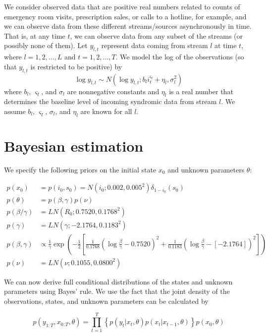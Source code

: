 \documentclass{article}
\begin{document}
We consider observed data that are positive real numbers related to counts of emergency room visits, prescription sales, or calls to a hotline, for example, and we can observe data from these different streams/sources asynchronously in time. That is, at any time $t$, we can observe data from any subset of the streams (or possibly none of them). Let $y_{l,t}$ represent data coming from stream $l$ at time $t$, where $l = 1,2,\ldots,L$ and $t = 1,2,\ldots,T$. We model the log of the observations (so that $y_{l,t}$ is restricted to be positive) by
\begin{equation}
\log y_{l,t} \sim N\left(\log y_{l,t};b_li_t^{\varsigma_l} + \eta_l,\sigma_l^2\right) \label{eqn:obs}
\end{equation}
where $b_l$, $\varsigma_l$, and $\sigma_l$ are nonnegative constants and $\eta_l$ is a real number that determines the baseline level of incoming syndromic data from stream $l$. We assume $b_l$, $\varsigma_l$, $\sigma_l$, and $\eta_l$ are known for all $l$.

\section{Bayesian estimation}

We specify the following priors on the initial state $x_0$ and unknown parameters $\theta$:

\begin{align*}
p(x_0) &= p(i_0,s_0) = N(i_0;0.002,0.005^2)\delta_{1 - i_0}(s_0) \\
p(\theta) &= p(\beta,\gamma)p(\nu) \\
p(\beta/\gamma) &= LN(R_0; 0.7520, 0.1768^2) \\
p(\gamma) &= LN(\gamma;-2.1764,0.1183^2) \\
p(\beta, \gamma) &\propto \frac{1}{\gamma} \exp\left(-\frac{1}{2} \left[\frac{1}{0.1768}(\log\frac{\beta}{\gamma} - 0.7520)^2 + \frac{1}{0.1183}(\log\frac{\beta}{\gamma} - [-2.1764])^2\right] \right) \\
p(\nu) &= LN(\nu;0.1055,0.0800^2)
\end{align*}

We can now derive full conditional distributions of the states and unknown parameters using Bayes' rule. We use the fact that the joint density of the observations, states, and unknown parameters can be calculated by

\begin{equation}
p(y_{1:T},x_{0:T},\theta) = \prod_{t = 1}^T \left\{p(y_t|x_t,\theta)p(x_t|x_{t-1},\theta)\right\}p(x_0,\theta) \label{eqn:joint}
\end{equation}
\end{document}
